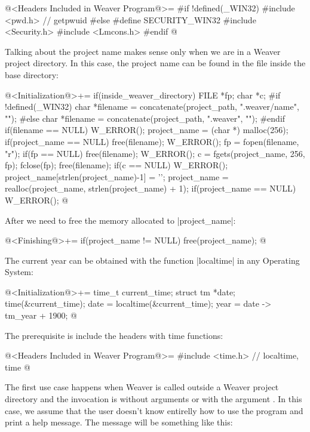 {@<Headers Included in Weaver Program@>=
#if !defined(_WIN32)
#include <pwd.h> // getpwuid
#else
#define SECURITY_WIN32
#include <Security.h>
#include <Lmcons.h>
#endif
@


Talking about the project name makes sense only when we are in a
Weaver project directory. In this case, the project name can be found
in the file  inside the base directory:

\iniciocodigo
@<Initialization@>+=
if(inside_weaver_directory){
  FILE *fp;
  char *c;
#if !defined(_WIN32)
  char *filename = concatenate(project_path, ".weaver/name", "");
#else
  char *filename = concatenate(project_path, ".weaver\name", "");
#endif
  if(filename == NULL) W_ERROR();
  project_name = (char *) malloc(256);
  if(project_name == NULL){
    free(filename);
    W_ERROR();
  }
  fp = fopen(filename, "r");
  if(fp == NULL){
    free(filename);
    W_ERROR();
  }
  c = fgets(project_name, 256, fp);
  fclose(fp);
  free(filename);
  if(c == NULL) W_ERROR();
  project_name[strlen(project_name)-1] = '\0';
  project_name = realloc(project_name, strlen(project_name) + 1);
  if(project_name == NULL) W_ERROR();
}
@
\fimcodigo

After we need to free the memory allocated to |project_name|:

\iniciocodigo
@<Finishing@>+=
if(project_name != NULL) free(project_name);
@
\fimcodigo


The current year can be obtained with the function |localtime| in
any Operating System:

\iniciocodigo
@<Initialization@>+=
{
  time_t current_time;
  struct tm *date;
  time(&current_time);
  date = localtime(&current_time);
  year = date -> tm_year + 1900;
}
@
\fimcodigo

The prerequisite is include the headers with time functions:

\iniciocodigo
@<Headers Included in Weaver Program@>=
#include <time.h> // localtime, time
@
\fimcodigo



The first use case happens when Weaver is called outside a Weaver
project directory and the invocation is without arguments or with the
argument . In this case, we assume that the user
doesn't know entirelly how to use the program and print a help
message. The message will be something like this:

}
